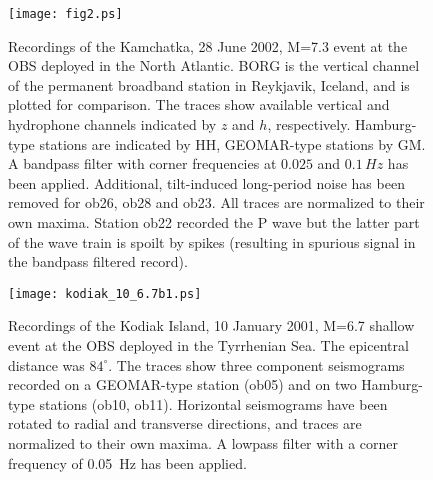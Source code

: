 \documentclass{article}
\renewcommand{\includegraphics}[2][1]{{\sf Figure: {\tt #1}}}
\begin{document}
{%
\begin{figure}
\centerline{\texttt{[image: fig2.ps]}}
\caption{Recordings 
of the Kamchatka, 28 June 2002, M=7.3 event 
at the OBS deployed in the 
North Atlantic. 
BORG is the vertical channel of the permanent broadband station in Reykjavik, Iceland,
and is plotted for comparison.
The traces show
available vertical and hydrophone channels
 indicated by $z$
and $h$, respectively.
Hamburg-type stations are indicated by HH, GEOMAR-type stations by GM.
A bandpass filter with corner frequencies at 
$0.025$ and $0.1 \, Hz$ has been 
applied. 
Additional, tilt-induced long-period noise has been removed for 
ob26, ob28 and ob23.
All traces are normalized to their own maxima.
Station ob22 recorded the P wave but the latter part of the wave train
is spoilt by spikes (resulting in spurious signal in the bandpass
filtered record).
}
\label{kamchatka_M7.3}
\end{figure}

\begin{figure}
\centerline{\texttt{[image: kodiak\_10\_6.7b1.ps]}}
\caption{Recordings 
of the Kodiak Island, 10 January 2001, M=6.7 shallow event 
at the OBS deployed in the 
Tyrrhenian Sea. 
The epicentral distance was $84^{\circ}$.
The traces show three component seismograms recorded on a 
GEOMAR-type station (ob05) and on two Hamburg-type stations 
(ob10, ob11). 
Horizontal seismograms have been rotated to 
radial and
transverse directions,
and 
traces are normalized to their own maxima.
A lowpass filter with a corner frequency of
0.05\, Hz has been applied.
}
\label{quake_tysea}
\end{figure}


}
\end{document}

